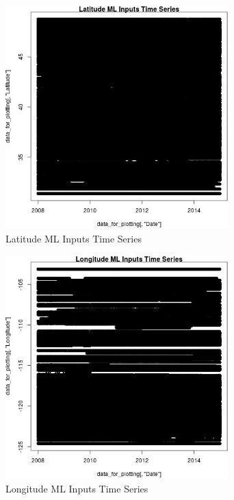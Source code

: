 \begin{figure} 
\centering  
\includegraphics[width=0.77\textwidth]{Code_Outputs/ML_input_report_ML_input_PM25_Step5_part_d_de_duplicated_aves_ML_input_LatitudeTS.jpg} 
\caption{\label{fig:ML_input_report_ML_input_PM25_Step5_part_d_de_duplicated_aves_ML_inputLatitudeTS}Latitude ML Inputs Time Series} 
\end{figure} 
 

\begin{figure} 
\centering  
\includegraphics[width=0.77\textwidth]{Code_Outputs/ML_input_report_ML_input_PM25_Step5_part_d_de_duplicated_aves_ML_input_LongitudeTS.jpg} 
\caption{\label{fig:ML_input_report_ML_input_PM25_Step5_part_d_de_duplicated_aves_ML_inputLongitudeTS}Longitude ML Inputs Time Series} 
\end{figure} 
 

